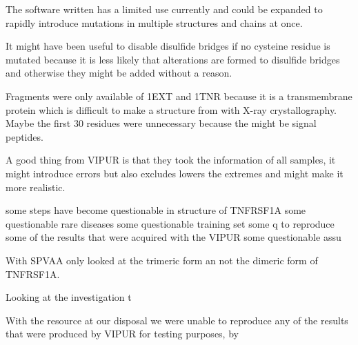 The software written has a limited use currently and could be expanded to rapidly introduce mutations in multiple structures and chains at once.

It might have been useful to disable disulfide bridges if no cysteine residue is mutated because it is less likely that alterations are formed to disulfide bridges and otherwise they might be added without a reason.

Fragments were only available of 1EXT and 1TNR because it is a transmembrane protein which is difficult to make a structure from with X-ray crystallography.
Maybe the first 30 residues were unnecessary because the might be signal peptides. 

A good thing from VIPUR is that they took the information of all samples, it might introduce errors but also excludes lowers the extremes and might make it more realistic.

 some steps have become questionable in structure of TNFRSF1A some questionable  rare diseases  some questionable  training set some q to reproduce some of the results that were acquired with the VIPUR some questionable assu

With SPVAA only looked at the trimeric form an not the dimeric form of TNFRSF1A.


Looking at the investigation t

With the resource at our disposal we were unable to reproduce any of the results that were produced by VIPUR for testing purposes, by 